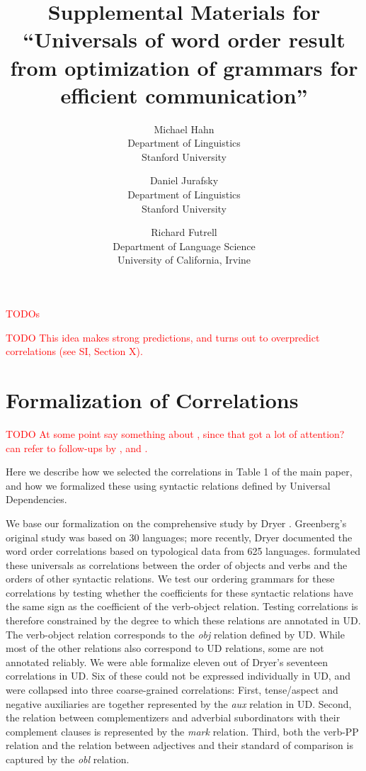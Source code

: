 \documentclass[10pt,twoside,lineno]{article}
\title{Supplemental Materials for ``Universals of word order result from optimization of grammars for efficient communication''}
\author{
        Michael Hahn \\
                Department of Linguistics\\
       Stanford University
            \and
       Daniel Jurafsky\\
       Department of Linguistics\\
       Stanford University \\
       \and
       Richard Futrell\\
       Department of Language Science\\
       University of California, Irvine
}
\begin{document}
\maketitle




\tableofcontents


\textcolor{red}{TODOs}

\textcolor{red}{TODO This idea makes strong predictions, and turns out to overpredict correlations (see SI, Section X).}


\section{Formalization of Correlations}\label{sec:correlations}

\textcolor{red}{TODO At some point say something about \cite{dunn2011evolved}, since that got a lot of attention? can refer to follow-ups by \cite{levy2011computational}, and \cite{croft2011greenbergian}.}

Here we describe how we selected the correlations in Table 1 of the main paper, and how we formalized these using syntactic relations defined by Universal Dependencies.

We base our formalization on the comprehensive study by Dryer \cite{dryer1992greenbergian}.
Greenberg's original study was based on 30 languages; more recently, Dryer \cite{dryer1992greenbergian} documented the word order correlations based on typological data from 625 languages.
\cite{dryer1992greenbergian} formulated these universals as correlations between the order of objects and verbs and the orders of other syntactic relations.
We test our ordering grammars for these correlations by testing whether the coefficients for these syntactic relations have the same sign as the coefficient of the verb-object relation.
Testing correlations is therefore constrained by the degree to which these relations are annotated in UD.
The verb-object relation corresponds to the  \emph{obj} relation defined by UD.
While most of the other relations also correspond to UD relations, some are not annotated reliably.
We were able formalize eleven out of Dryer's seventeen correlations in UD.
Six of these could not be expressed individually in UD, and were collapsed into three coarse-grained correlations:
First, tense/aspect and negative auxiliaries are together represented by the \emph{aux} relation in UD.
Second, the relation between complementizers and adverbial subordinators with their complement clauses is represented by the \emph{mark} relation.
Third, both the verb-PP relation and the relation between adjectives and their standard of comparison is captured by the \emph{obl} relation.
\end{document}
